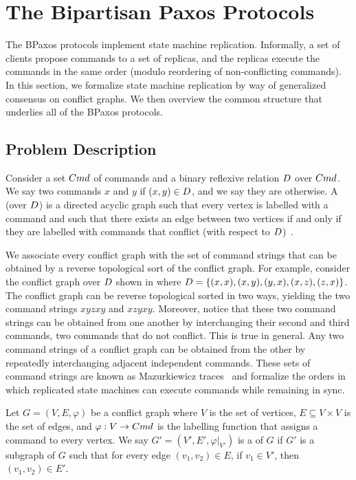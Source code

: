 \section{The Bipartisan Paxos Protocols}
The BPaxos protocols implement state machine replication. Informally, a set of
clients propose commands to a set of replicas, and the replicas execute the
commands in the same order (modulo reordering of non-conflicting commands). In
this section, we formalize state machine replication by way of generalized
consensus on conflict graphs. We then overview the common structure that
underlies all of the BPaxos protocols.

\subsection{Problem Description}
Consider a set $Cmd$ of commands and a binary reflexive relation $D$
over $Cmd$. We say two commands $x$ and $y$  if $(x, y) \in
D$, and we say they are  otherwise. A
 (over $D$) is a directed acyclic graph such
that every vertex is labelled with a command and such that there exists an edge
between two vertices if and only if they are labelled with commands that
conflict (with respect to $D$)~\cite{mazurkiewicz1995introduction}.

{}

We associate every conflict graph with the set of command strings that can be
obtained by a reverse topological sort of the conflict graph. For example,
consider the conflict graph over $D$ shown in
 where
  $D = \{(x, x), (x, y), (y, x), (x, z), (z, x)\}$.
The conflict graph can be reverse topological sorted in two ways, yielding the
two command strings $xyzxy$ and $xzyxy$. Moreover, notice that these two
command strings can be obtained from one another by interchanging their second
and third commands, two commands that do not conflict. This is true in general.
Any two command strings of a conflict graph can be obtained from the other by
repeatedly interchanging adjacent independent commands. These sets of command
strings are known as Mazurkiewicz traces~\cite{mazurkiewicz1985semantics,
mazurkiewicz1995introduction} and formalize the orders in which replicated
state machines can execute commands while remaining in sync.

Let $G = (V, E, \varphi)$ be a conflict graph where $V$ is the set of vertices,
$E \subseteq V \times V$ is the set of edges, and $\varphi: V \to Cmd$ is the
labelling function that assigns a command to every vertex. We say $G' = (V',
E', \varphi|_{V'})$ is a  of $G$ if $G'$ is a subgraph of $G$
such that for every edge $(v_1, v_2) \in E$, if $v_1 \in V'$, then $(v_1, v_2)
\in E'$.

